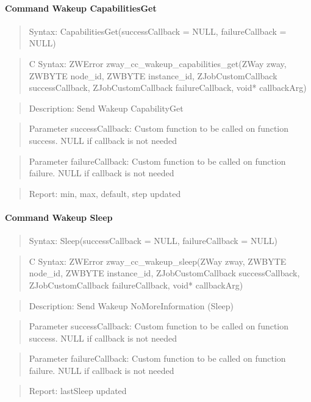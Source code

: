 \paragraph{Command Wakeup CapabilitiesGet}
\begin{quote}Syntax: CapabilitiesGet(successCallback = NULL, failureCallback = NULL)\end{quote}
\begin{quote}C Syntax: ZWError zway\_cc\_wakeup\_capabilities\_get(ZWay zway, ZWBYTE node\_id, ZWBYTE instance\_id, ZJobCustomCallback successCallback, ZJobCustomCallback failureCallback, void* callbackArg)\end{quote}
\begin{quote}Description: Send Wakeup CapabilityGet\end{quote}
\begin{quote}Parameter successCallback: Custom function to be called on function success. NULL if callback is not needed\end{quote}
\begin{quote}Parameter failureCallback: Custom function to be called on function failure. NULL if callback is not needed\end{quote}
\begin{quote}Report: min, max, default, step updated\end{quote}

\paragraph{Command Wakeup Sleep}
\begin{quote}Syntax: Sleep(successCallback = NULL, failureCallback = NULL)\end{quote}
\begin{quote}C Syntax: ZWError zway\_cc\_wakeup\_sleep(ZWay zway, ZWBYTE node\_id, ZWBYTE instance\_id, ZJobCustomCallback successCallback, ZJobCustomCallback failureCallback, void* callbackArg)\end{quote}
\begin{quote}Description: Send Wakeup NoMoreInformation (Sleep)\end{quote}
\begin{quote}Parameter successCallback: Custom function to be called on function success. NULL if callback is not needed\end{quote}
\begin{quote}Parameter failureCallback: Custom function to be called on function failure. NULL if callback is not needed\end{quote}
\begin{quote}Report: lastSleep updated\end{quote}

